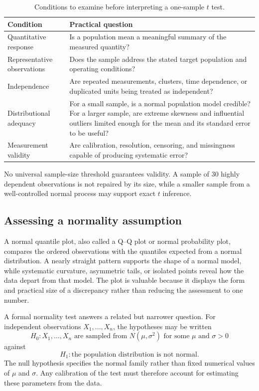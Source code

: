 \begin{table}[htbp]
\centering
\caption{Conditions to examine before interpreting a one-sample $t$ test.}
\label{tab:one-sample-t-conditions}
\begin{tabularx}{\textwidth}{@{}l>{\raggedright\arraybackslash}X@{}}
\toprule
Condition & Practical question \\
\midrule
Quantitative response & Is a population mean a meaningful summary of the measured quantity? \\
Representative observations & Does the sample address the stated target population and operating conditions? \\
Independence & Are repeated measurements, clusters, time dependence, or duplicated units being treated as independent? \\
Distributional adequacy & For a small sample, is a normal population model credible? For a larger sample, are extreme skewness and influential outliers limited enough for the mean and its standard error to be useful? \\
Measurement validity & Are calibration, resolution, censoring, and missingness capable of producing systematic error? \\
\bottomrule
\end{tabularx}
\end{table}

No universal sample-size threshold guarantees validity. A sample of 30 highly dependent observations is not repaired by its size, while a smaller sample from a well-controlled normal process may support exact $t$ inference.

\subsection{Assessing a normality assumption}
\label{sec:formal-normality-assessment}

A normal quantile plot, also called a Q--Q plot or normal probability plot, compares the ordered observations with the quantiles expected from a normal distribution. A nearly straight pattern supports the shape of a normal model, while systematic curvature, asymmetric tails, or isolated points reveal how the data depart from that model. The plot is valuable because it displays the form and practical size of a discrepancy rather than reducing the assessment to one number.

A formal normality test answers a related but narrower question. For independent observations $X_1,\ldots,X_n$, the hypotheses may be written
\[
H_0:X_1,\ldots,X_n\text{ are sampled from }N(\mu,\sigma^2)
\text{ for some }\mu\text{ and }\sigma>0
\]
against
\[
H_1:\text{the population distribution is not normal}.
\]
The null hypothesis specifies the normal family rather than fixed numerical values of $\mu$ and $\sigma$. Any calibration of the test must therefore account for estimating these parameters from the data.

